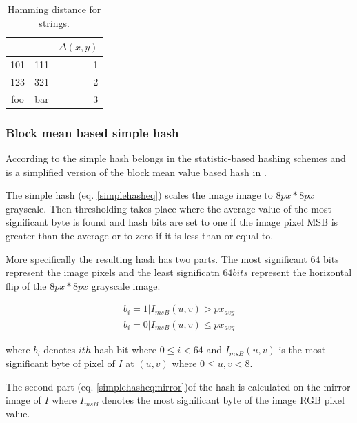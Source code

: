 \documentclass[english,12pt,a4paper,pdftex,elec,utf8]{aaltothesis}
\begin{document}
\begin{table}[htb]
\caption{Hamming distance for strings.}
\label{hammingexamples}
\begin{center}
  \begin{tabular}{ccr}
&&$\Delta(x,y)$\\
    \hline \hline
    101 & 111 & 1\\
    \hline
    123 & 321 & 2\\
    \hline
    foo & bar & 3\\
    \hline
\end{tabular}
\end{center}\end{table}



\subsubsection{Block mean based simple hash}
According to \cite[p. 20]{Hadmi2012} the simple hash belongs in the statistic-based hashing schemes and is a simplified version of the block mean value based hash in \cite{Yang2006}.

The simple hash (eq. \ref{simplehasheq}) scales the image image to $8px * 8px$ grayscale. Then thresholding takes place where the average value of the most significant byte is found and hash bits are set to one if the image pixel MSB is greater than the average or to zero if it is less than or equal to.

More specifically the resulting hash has two parts. The most significant $64$ bits represent the image pixels and the least significatn $64bits$ represent the horizontal flip of the $8px * 8px$ grayscale image.

\begin{equation} \label{simplehasheq}
  \begin{split}
  b_{i} = 1 | I_{msB}(u,v) > px_{avg}\\
  b_{i} = 0 | I_{msB}(u,v) \leq px_{avg}
  \end{split}
\end{equation}

where $b_{i}$ denotes $ith$ hash bit where $0 \leq i < 64$ and $I_{msB}(u,v)$ is the most significant byte of pixel of $I$ at $(u,v)$ where $0 \leq u,v < 8$.

The second part (eq. \ref{simplehasheqmirror})of the hash is calculated on the mirror image of $I$ where $I_{msB}$ denotes the most significant byte of the image RGB pixel value.
\end{document}
